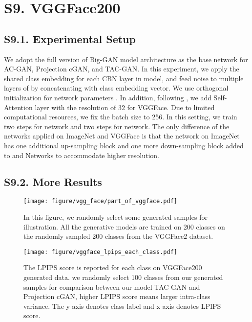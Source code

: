 \section*{S9. VGGFace200}


\subsection*{S9.1. Experimental Setup}
We adopt the full version of Big-GAN model architecture as the base network for AC-GAN, Projection cGAN, and TAC-GAN. In this experiment, we apply the shared class embedding for each CBN layer in  model, and feed noise  to multiple layers of  by concatenating with class embedding vector. We use orthogonal initialization for network parameters \cite{brock2018large}. In addition, following \cite{brock2018large}, we add Self-Attention layer with the resolution of 32 for VGGFace. Due to limited computational resources, we fix the batch size to 256. In this setting, we train two steps for  network and two steps for  network. The only difference of the networks applied on ImageNet and VGGFace is that the network on ImageNet has one additional up-sampling block and one more down-sampling block added to  and  Networks to accommodate higher resolution.

\subsection*{S9.2. More Results}

\begin{figure}[H]
\centering\texttt{[image: figure/vgg\_face/part\_of\_vggface.pdf]}
  \caption{In this figure, we randomly select some generated samples for illustration. All the generative models are trained on 200 classes on the randomly sampled 200 classes from the VGGFace2 dataset.}
  \label{part_imagenet}
\end{figure}

\begin{figure}[H]
\vspace{-5cm}\hspace{-3cm}\texttt{[image: figure/vggface\_lpips\_each\_class.pdf]}
\vspace{-3.8cm}
  \caption{The LPIPS score is reported for each class on VGGFace200 generated data. we randomly select 100 classes from our generated samples for comparison between our model TAC-GAN and Projection cGAN, higher LPIPS score means larger intra-class variance. The y axis denotes class label and x axis denotes LPIPS score.}
  \label{vggface_lpips_each_class}
\end{figure}
%
